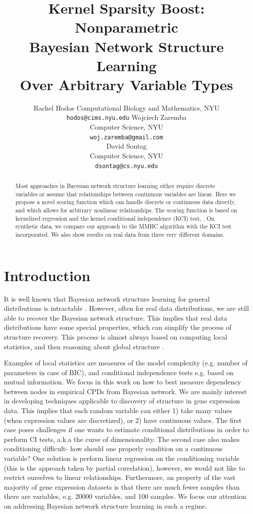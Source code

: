 \documentclass{article} %
\title{Kernel Sparsity Boost: Nonparametric \\ Bayesian Network Structure Learning \\ Over Arbitrary Variable Types}
\author{
Rachel Hodos
Computational Biology and Mathematics, NYU
\texttt{hodos@cims.nyu.edu}
\Xnd
Wojciech Zaremba \\
Computer Science, NYU \\
\texttt{woj.zaremba@gmail.com} \\
\Xnd
David Sontag \\
Computer Science, NYU \\
\texttt{dsontag@cs.nyu.edu} \\
}
\begin{document}
\maketitle

\begin{abstract}

Most approaches in Bayesian network structure learning either require discrete variables or assume that relationships between continuous variables are linear.  Here we propose a novel scoring function which can handle discrete or continuous data directly, and which allows for arbitrary nonlinear relationships.  The scoring function is based on kernelized regression and the kernel conditional independence (KCI) test, \cite{zhang2012kernel}.  On synthetic data, we compare our approach to the MMHC algorithm with the KCI test incorporated.  We also show results on real data from three very different domains.

\end{abstract}


\section{Introduction}
It is well known that Bayesian network structure learning for general distributions is intractable \cite{chickering1996learning}. However, often for real data distributions, we are still able to recover the Bayesian network structure. This implies that real data distributions have some special properties, which can simplify the process of structure recovery.  This  process is almost always based on computing local statistics, and then reasoning about global structure \cite{jaakkola2010learning, tsamardinos2006max}. 

Examples of local statistics are measures of the model complexity (e.g. number of parameters in case of BIC\cite{schwarz1978estimating}), and conditional independence tests e.g. based on mutual information.  We focus in this work on how to best measure dependency between nodes in empirical CPDs from Bayesian network. We are mainly interest in developing techniques applicable to discovery of structure in gene expression data. This implies that each random variable can either 1) take many values (when expression values are discretized), or 2) have continuous values. The first case poses challenges if one wants to estimate conditional distributions in order to perform CI tests, a.k.a the curse of dimensionality.  The second case also makes conditioning difficult- how should one properly condition on a continuous variable?  One solution is perform linear regression on the conditioning variable (this is the approach taken by partial correlation), however, we would not like to restrict ourselves to linear relationships.  Furthermore, an property of the vast majority of gene expression datasets is that there are much fewer samples than there are variables, e.g. 20000 variables, and 100 samples.   We focus our attention on addressing Bayesian network structure learning
in such a regime. 
\end{document}
